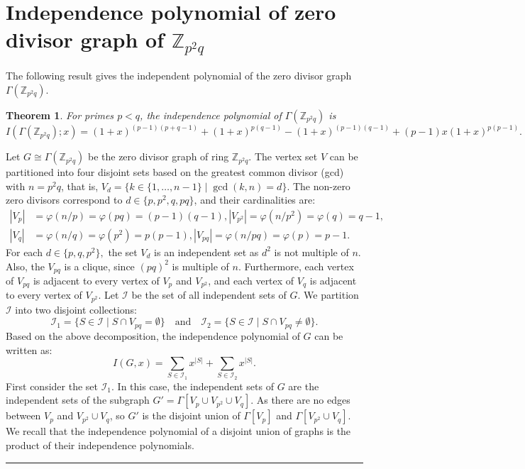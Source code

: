 \documentclass[12pt,twoside]{article}
\newtheorem{theorem}{Theorem}[section]
\renewenvironment{proof}{{\noindent\bfseries Proof.}}{\qed}
\def\qed{\nolinebreak\hfill\rule{.2cm}{.2cm}\par\addvspace{.5cm}}
\begin{document}
\section{Independence polynomial of zero divisor graph of $ \mathbb{Z}_{p^2q}$}\label{section 3}
The following result gives the independent  polynomial of the zero divisor graph $\varGamma(\mathbb{Z}_{p^2q})$.
\begin{theorem}\label{ind poly zp^2q}
	For primes $p<q$, the independence polynomial of $\varGamma(\mathbb{Z}_{p^2q})$ is
	$$I(\varGamma(\mathbb{Z}_{p^2q}); x) = (1+x)^{(p-1)(p+q-1)} + (1+x)^{p(q-1)} - (1+x)^{(p-1)(q-1)} + (p-1)x(1+x)^{p(p-1)}.$$
\end{theorem}
\begin{proof}
	Let $G\cong \varGamma(\mathbb{Z}_{p^2q})$ be the zero divisor graph of ring $\mathbb{Z}_{p^2q}.$ The vertex set $V$ can be partitioned into four disjoint sets based on the greatest common divisor (gcd) with $n=p^2q$, that is,
	$V_d = \{k \in \{1, \dots, n-1\} \mid \gcd(k, n) = d\}$. The non-zero zero divisors correspond to $d \in \{p, p^2, q, pq\}$, and their cardinalities are:
	\begin{align*}
		|V_p| &= \varphi(n/p) = \varphi(pq) = (p-1)(q-1), |V_{p^2}| = \varphi(n/p^2) = \varphi(q) = q-1,\\
		|V_q| &= \varphi(n/q) = \varphi(p^2) = p(p-1), |V_{pq}| = \varphi(n/pq) = \varphi(p) = p-1.
	\end{align*}
	For each $d\in \{p,q,p^{2}\},$ the set $V_{d} $ is an independent set as $d^{2}$ is not multiple of $n$. Also, the $V_{pq}$ is a clique, since $(pq)^{2}$ is multiple of $n$. Furthermore, each vertex of $V_{pq}$ is adjacent to every vertex of $V_{p}$ and $V_{p^{2}}$, and each vertex of $V_{q}$ is adjacent to every vertex of $V_{p^{2}}.$  
	Let $\mathcal{I}$ be the set of all independent sets of $G$. We partition $\mathcal{I}$ into two disjoint collections:
	$$\mathcal{I}_1 = \{S \in \mathcal{I} \mid S \cap V_{pq} = \emptyset\}\quad \text{and}\quad \mathcal{I}_2 = \{S \in \mathcal{I} \mid S \cap V_{pq} \neq \emptyset\}.$$ 
	Based on the above decomposition, the independence polynomial of $G$ can be written as: 
	$$I(G, x) = \sum_{S \in \mathcal{I}_1} x^{|S|} + \sum_{S \in \mathcal{I}_2} x^{|S|}.$$
	First consider the set $\mathcal{I}_1$. In this case, the independent sets of $G$ are the independent sets of the subgraph $G' = \varGamma[V_p \cup V_{p^2} \cup V_q]$. As there are no edges between $V_p$ and $V_{p^2} \cup V_q$, so $G'$ is the disjoint union of $\varGamma[V_p]$ and $\varGamma[V_{p^2} \cup V_q]$. We recall that  the independence polynomial of a disjoint union of graphs is the product of their independence polynomials.

\end{proof}
\end{document}
